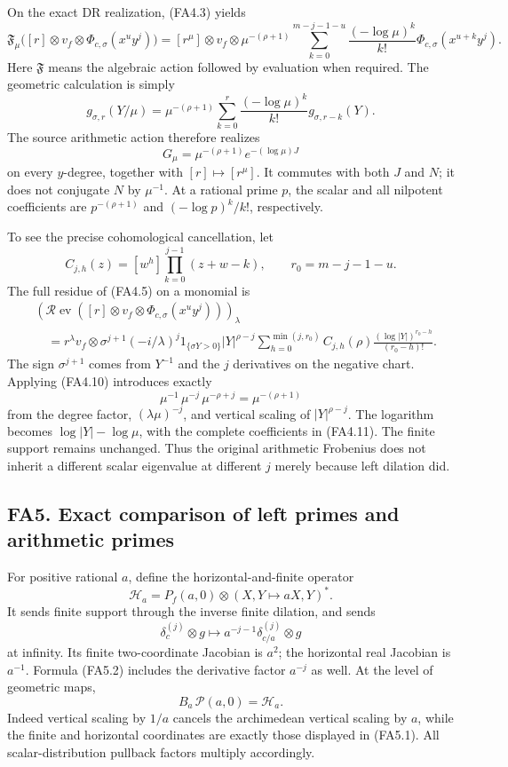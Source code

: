 On the exact DR realization, (FA4.3) yields \[
 \boxed{
 \mathfrak F_\mu\bigl([r]\otimes v_f\otimes
             \Phi_{c,\sigma}(x^uy^j)\bigr)
  =[r^\mu]\otimes v_f\otimes
    \mu^{-(\rho+1)}
       \sum_{k=0}^{m-j-1-u}
          \frac{(-\log\mu)^k}{k!}
           \Phi_{c,\sigma}(x^{u+k}y^j).
 }
\tag{FA4.11}
\] Here \(\mathfrak F\) means the algebraic action followed by
evaluation when required. The geometric calculation is simply \[
 g_{\sigma,r}(Y/\mu)
    =\mu^{-(\rho+1)}
      \sum_{k=0}^r\frac{(-\log\mu)^k}{k!}g_{\sigma,r-k}(Y).
\] The source arithmetic action therefore realizes \[
 G_\mu=\mu^{-(\rho+1)}e^{-(\log\mu)J}
\tag{FA4.12}
\] on every \(y\)-degree, together with \([r]\mapsto[r^\mu]\). It
commutes with both \(J\) and \(N\); it does not conjugate \(N\) by
\(\mu^{-1}\). At a rational prime \(p\), the scalar and all nilpotent
coefficients are \(p^{-(\rho+1)}\) and \((-\log p)^k/k!\), respectively.

To see the precise cohomological cancellation, let \[
 C_{j,h}(z)=[w^h]\prod_{k=0}^{j-1}(z+w-k),\qquad
 r_0=m-j-1-u.
\] The full residue of (FA4.5) on a monomial is \[
 \begin{aligned}
 &\left(\mathcal R\operatorname{ev}
   ([r]\otimes v_f\otimes\Phi_{c,\sigma}(x^uy^j))
       \right)_\lambda\\
 &\quad=
 r^\lambda v_f\otimes
 \sigma^{j+1}(-i/\lambda)^j
   1_{\{\sigma Y>0\}}|Y|^{\rho-j}
   \sum_{h=0}^{\min(j,r_0)}
      C_{j,h}(\rho)
       \frac{(\log|Y|)^{r_0-h}}{(r_0-h)!}.
 \end{aligned}
\tag{FA4.13}
\] The sign \(\sigma^{j+1}\) comes from \(Y^{-1}\) and the \(j\)
derivatives on the negative chart. Applying (FA4.10) introduces exactly
\[
 \mu^{-1}\,\mu^{-j}\,\mu^{-\rho+j}
      =\mu^{-(\rho+1)}
\tag{FA4.14}
\] from the degree factor, \((\lambda\mu)^{-j}\), and vertical scaling
of \(|Y|^{\rho-j}\). The logarithm becomes \(\log|Y|-\log\mu\), with the
complete coefficients in (FA4.11). The finite support remains unchanged.
Thus the original arithmetic Frobenius does not inherit a different
scalar eigenvalue at different \(j\) merely because left dilation did.

\subsection{FA5. Exact comparison of left primes and arithmetic
primes}\label{fa5.-exact-comparison-of-left-primes-and-arithmetic-primes}

For positive rational \(a\), define the horizontal-and-finite operator
\[
 \mathcal H_a
   =P_f(a,0)\otimes(X,Y\mapsto aX,Y)^*.
\tag{FA5.1}
\] It sends finite support through the inverse finite dilation, and
sends \[
 \delta_c^{(j)}\otimes g
       \longmapsto
       a^{-j-1}\delta_{c/a}^{(j)}\otimes g
\tag{FA5.2}
\] at infinity. Its finite two-coordinate Jacobian is \(a^2\); the
horizontal real Jacobian is \(a^{-1}\). Formula (FA5.2) includes the
derivative factor \(a^{-j}\) as well. At the level of geometric maps, \[
 B_a\,\mathcal P(a,0)=\mathcal H_a.
\tag{FA5.3}
\] Indeed vertical scaling by \(1/a\) cancels the archimedean vertical
scaling by \(a\), while the finite and horizontal coordinates are
exactly those displayed in (FA5.1). All scalar-distribution pullback
factors multiply accordingly.

